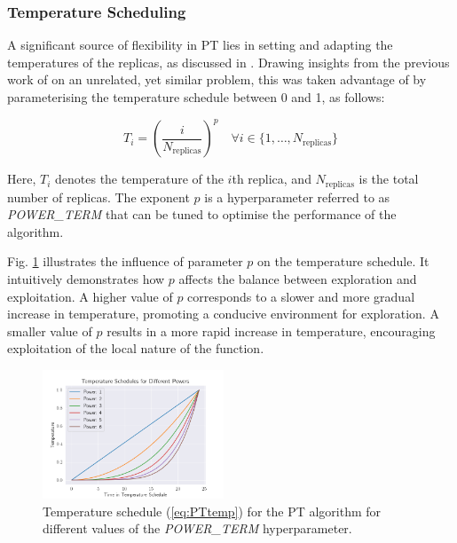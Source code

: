 \documentclass[10pt]{article}
\begin{document}
\begin{multicols}{2}
\subsubsection{Temperature Scheduling}

A significant source of flexibility in PT lies in setting and adapting the temperatures of the replicas, as discussed in \cite{Earl_2005}. Drawing insights from the previous work of \cite{CALDERHEAD20094028} on an unrelated, yet similar problem, this was taken advantage of by parameterising the temperature schedule between 0 and 1, as follows:

\begin{equation}
    T_i = \left(\frac{i}{{N_{\text{replicas}}}}\right)^p \quad \forall i \in \{1, \dots, N_{\text{replicas}}\}
    \label{eq:PTtemp}
\end{equation}

Here, $T_i$ denotes the temperature of the $i$th replica, and $N_{\text{replicas}}$ is the total number of replicas. The exponent $p$ is a hyperparameter referred to as \textit{POWER\_TERM} that can be tuned to optimise the performance of the algorithm. 

Fig. \ref{fig:PTtemp} illustrates the influence of parameter $p$ on the temperature schedule. It intuitively demonstrates how $p$ affects the balance between exploration and exploitation. A higher value of $p$ corresponds to a slower and more gradual increase in temperature, promoting a conducive environment for exploration. A smaller value of $p$ results in a more rapid increase in temperature, encouraging exploitation of the local nature of the function.

\begin{figure}[H]
    \centering
    \includegraphics[width=0.48\textwidth]{../figures/Permanent Images/Power_Progression.png}
    \captionsetup{justification=centering}
    \caption{Temperature schedule (\ref{eq:PTtemp}) for the PT algorithm for different values of the \textit{POWER\_TERM} hyperparameter.}
    \label{fig:PTtemp}
\end{figure}


\end{multicols}
\end{document}
